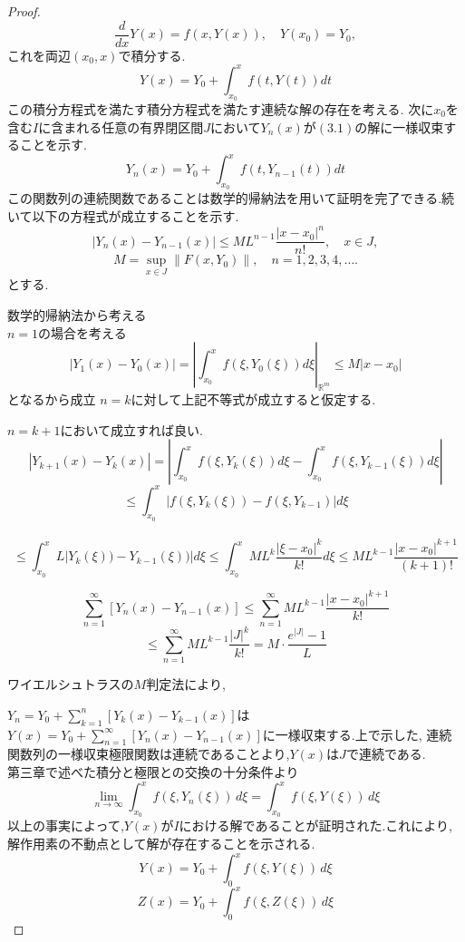 \documentclass[12pt,xelatex,ja=standard]{bxjsarticle}
\begin{document}
\begin{proof}
\[\frac{d}{dx}Y(x) = f(x, Y(x)), \quad Y(x_{0}) = Y_{0},\]
これを両辺$(x_{0},x)$で積分する.
 \[Y(x)=Y_{0}+\displaystyle \int_{x_{0}}^{x} f(t,Y(t)) dt\]
この積分方程式を満たす積分方程式を満たす連続な解の存在を考える.
       次に$x_{0}$を含む$I$に含まれる任意の有界閉区間$J$において$Y_{n}(x)$が$(3.1)$の解に一様収束することを示す.
       \[Y_{n}(x)=Y_{0}+\displaystyle \int_{x_{0}}^{x} f(t,Y_{n-1}(t)) dt\]
       この関数列の連続関数であることは数学的帰納法を用いて証明を完了できる.続いて以下の方程式が成立することを示す.
\[
| Y_{n}(x) - Y_{n-1}(x) | \leq M L^{n-1} \frac{|x - x_0|^{n}}{n!}, \quad x \in J,
\]
\[
M = \sup_{x \in J} \|F(x, Y_0)\|, \quad n = 1, 2, 3, 4, \dots.
\]
とする.

    数学的帰納法から考える\\
    $n=1$の場合を考える
    \[\left| Y_{1}(x)-Y_{0}(x) \right| =\left|\displaystyle \int_{x_{0}}^{x}  f(\xi,Y_{0}(\xi)) d\xi \right|_{\mathbb{R}^{m}}\leq M|x-x_{0}| \]
となるから成立
$n=k$に対して上記不等式が成立すると仮定する.

$n=k+1$において成立すれば良い.
\[\left| Y_{k+1}(x)-Y_{k}(x) \right| =  \left|\displaystyle \int_{x_{0}}^{x}  f(\xi,Y_{k}(\xi)) d\xi -\displaystyle \int_{x_{0}}^{x}  f(\xi,Y_{k-1}(\xi)) d\xi\right| \]
\[\leq \displaystyle  \int_{x_{0}}^{x}  \left|f(\xi,Y_{k}(\xi))-f(\xi,Y_{k-1})\right| d\xi \]\
\[\leq \displaystyle  \int_{x_{0}}^{x}  L\left|Y_{k}(\xi))-Y_{k-1}(\xi))\right| d\xi \leq \displaystyle  \int_{x_{0}}^{x}ML^{k} \frac{\left|\xi - x_0\right|^{k}}{k!} d\xi \leq ML^{k-1}\frac{\left|x - x_0\right|^{k+1}}{(k+1)!}\]


\[ \displaystyle\sum_{n=1}^{\infty}[Y_{n}(x)-Y_{n-1}(x)] \leq  \displaystyle\sum_{n=1}^{\infty}ML^{k-1}\frac{\left|x - x_0\right|^{k+1}}{k!}\]
\[\leq \displaystyle\sum_{n=1}^{\infty}ML^{k-1}\frac{\left|J\right|^{k}}{k!}=M \cdot \frac{e^{|J|}-1}{L}\]

ワイエルシュトラスの$M$判定法により,

$Y_{n}=Y_{0}+\displaystyle\sum_{k=1}^{n} [Y_{k}(x)-Y_{k-1}(x)]$は$Y(x)=Y_{0}+\displaystyle\sum_{n=1}^{\infty} [Y_{n}(x)-Y_{n-1}(x)]$に一様収束する.上で示した, 連続関数列の一様収束極限関数は連続であることより,$Y(x)$は$J$で連続である.\\
第三章で述べた積分と極限との交換の十分条件より
    \[\lim_{n \to \infty} \displaystyle \int_{x_{0}}^{x} f(\xi,Y_{n}(\xi)) \, d\xi = \displaystyle \int_{x_{0}}^{x} f(\xi,Y(\xi)) \, d\xi \]
以上の事実によって,$Y(x)$が$I$における解であることが証明された.これにより,解作用素の不動点として解が存在することを示される.
\[
Y(x) = Y_{0} + \displaystyle \int_{0}^{x} f(\xi, Y(\xi)) \, d\xi
\]
\[
Z(x) = Y_{0} + \displaystyle \int_{0}^{x} f(\xi, Z(\xi)) \, d\xi
\]


\end{proof}
\end{document}
